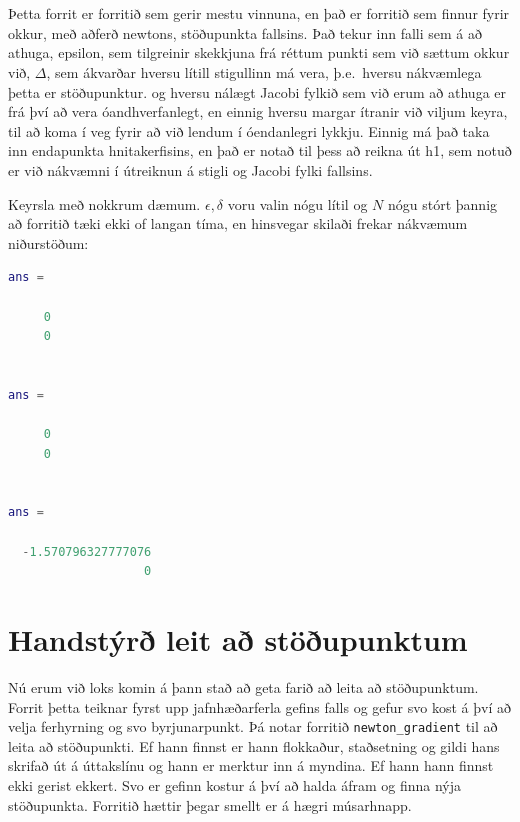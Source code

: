 \documentclass[a4]{article}
\begin{document}
\section{}
Þetta forrit er forritið sem gerir mestu vinnuna, en það er forritið sem finnur fyrir okkur, með aðferð newtons, stöðupunkta fallsins. Það tekur inn falli sem á að athuga,
epsilon, sem tilgreinir skekkjuna frá réttum punkti sem við sættum okkur við,
$\Delta$, sem ákvarðar hversu lítill stigullinn má vera, þ.e.\ hversu nákvæmlega þetta er stöðupunktur.
og hversu nálægt Jacobi fylkið sem við erum að athuga er frá því að vera óandhverfanlegt,
en einnig hversu margar ítranir við viljum keyra, til að koma í veg fyrir að við lendum í óendanlegri lykkju.
Einnig má það taka inn endapunkta hnitakerfisins, en það er notað til þess að reikna út h1, sem notuð er  við nákvæmni í útreiknun á stigli og Jacobi fylki fallsins.



Keyrsla með nokkrum dæmum. $\epsilon, \delta$ voru valin nógu lítil og $N$ nógu stórt þannig að forritið tæki ekki of langan tíma, en hinsvegar skilaði frekar nákvæmum niðurstöðum:


\begin{lstlisting}[language=Matlab]
ans =

     0
     0


ans =

     0
     0


ans =

  -1.570796327777076
                   0

\end{lstlisting}


\section{Handstýrð leit að stöðupunktum}

Nú erum við loks komin á þann stað að geta farið að leita að stöðupunktum. Forrit þetta teiknar fyrst upp jafnhæðarferla gefins falls og gefur svo kost á því að velja ferhyrning og svo byrjunarpunkt. Þá notar forritið \lstinline{newton_gradient} til að leita að stöðupunkti. Ef hann finnst er hann flokkaður, staðsetning og gildi hans skrifað út á úttakslínu og hann er merktur inn á myndina. Ef hann hann finnst ekki gerist ekkert. Svo er gefinn kostur á því að halda áfram og finna nýja stöðupunkta. Forritið hættir þegar smellt er á hægri músarhnapp.
\end{document}
